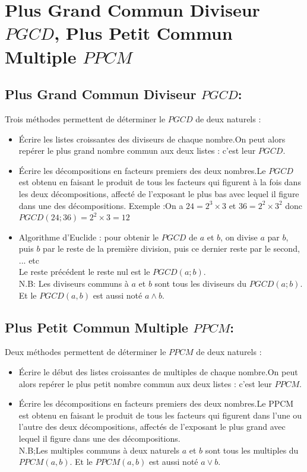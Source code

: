 \documentclass[11pt,a4paper,x11names,usenames,dvipsnames,svgnames,oneside]{ctexbook}
\begin{document}
	\section{Plus Grand Commun Diviseur $PGCD$, Plus Petit Commun Multiple $PPCM$}
	\subsection{ Plus Grand Commun Diviseur $PGCD$:}
	\begin{df}%
		Trois méthodes permettent de déterminer le $PGCD$ de deux naturels :
		\begin{itemize}
			\item Écrire les listes croissantes des diviseurs de chaque nombre.On peut alors repérer le plus grand nombre commun aux deux listes : c'est leur $PGCD$.
			\item Écrire les décompositions en facteurs premiers des deux nombres.Le $PGCD$ est obtenu en faisant le produit de tous les facteurs qui figurent à la fois dans les deux décompositions, affecté de l'exposant le plus bas avec lequel il figure dans une des décompositions.
			Exemple :On a $ 24=2^3\times 3$  et $ 36 = 2^2\times 3^2$  donc  $PGCD(24;36) = 2^2\times 3 = 12$
			\item Algorithme d'Euclide : pour obtenir le $PGCD$ de $a$ et $b$, on divise $a$ par $b$, puis $b$ par le reste de la première division, puis ce dernier reste par le second, ... etc\\
			Le reste précédent le reste nul est le $PGCD(a;b)$. \\
			N.B: Les diviseurs communs à $a$ et $b$ sont tous les diviseurs du $PGCD(a;b)$. Et le $ PGCD(a , b)$ est aussi noté $ a\wedge b$. 
		\end{itemize}
	\end{df}
	
	\subsection{ Plus Petit Commun Multiple $PPCM$:}
	\begin{df}%
		Deux méthodes permettent de déterminer le $PPCM$ de deux naturels :
		\begin{itemize}
			\item Écrire le début des listes croissantes de multiples de chaque nombre.On peut alors repérer le plus petit nombre commun aux deux listes : c'est leur $PPCM$.
			\item Écrire les décompositions en facteurs premiers des deux nombres.Le PPCM est obtenu en faisant le produit de tous les facteurs qui figurent dans l'une ou l'autre des deux décompositions, affectés de l'exposant le plus grand avec lequel il figure dans une des décompositions. \\
			N.B;Les multiples communs à deux naturels $a$ et $b$ sont tous les multiples du $PPCM(a , b)$. Et le $ PPCM(a , b)$ est aussi noté $ a\vee b$.  
		\end{itemize}
	\end{df}
\end{document}
